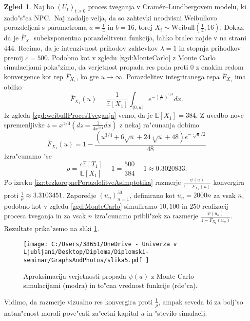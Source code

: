 \documentclass[12pt, a4paper, reqno]{amsart}
\theoremstyle{definition}
\newtheorem{zgled}[definicija]{Zgled}
\theoremstyle{plain}
\newcommand{\E}{\mathbb{E}}
\newcommand{\1}{\mathds{1}}
\begin{document}
        \begin{zgled}
        Naj bo $(U_t)_{t\geq0}$ proces tveganja v Cramér--Lundbergovem modelu, ki zado"s"ca NPC.\ Naj 
        nadalje velja, da so zahtevki neodvisni Weibullovo porazdeljeni s parametroma
        $a= \frac{1}{4}$ in $b= 16$, torej $X_i\sim\text{Weibull}(\frac{1}{4}, 16)$. 
        Dokaz, da je $\overline{F}_{X_1}$ subeksponentna porazdelitvena funkcija, lahko bralec 
        najde v \cite{9} na strani 444.
        Recimo, da je intenzivnost 
        prihodov zahtevkov $\lambda = 1$ in stopnja prihodkov premij $c = 500$.
        Podobno kot v zgledu \ref{zgd:MonteCarlo} z Monte Carlo simulacijami poka"zimo, da 
        verjetnost propada res pada proti $0$
        z enakim redom konvergence kot rep $\overline{F}_{X_1}$, ko gre $u\to\infty$. 
        Porazdelitev integriranega repa $\overline{F}_{X_1}$ ima obliko
        \begin{equation*}
            \overline{F}_{X_1}(u) = \frac{1}{\E\left[X_1\right]}\int_{(0, u]}e^{-\left(\tfrac{x}{16}\right)^{1/4}}dx.
        \end{equation*}
        Iz zgleda \ref{zgd:weibullProcesTveganja} vemo, da je $\E\left[X_1\right] = 384$. Z uvedbo nove spremenljivke
        $z = x^{1/4} (dz = \frac{1}{4x^{3/4}}dx)$ z nekaj ra"cunanja dobimo 
        \begin{equation*}
            \overline{F}_{X_1}(u) = 1 - \frac{\left(u^{3/4} + 6 \sqrt{u} + 24 \sqrt[4]{u} + 48\right)e^{-{\sqrt[4]{u}}/{2}}}{48}
        \end{equation*}
        Izra"cunamo "se 
        \begin{equation*}
        \rho = \frac{c \E\left[T_1\right]}{\E\left[X_1\right]} - 1 = \frac{500}{384} - 1 \approx 0.3020833.
        \end{equation*}
        Po izreku \ref{izr:tezkorepnePorazdelitveAsimptotika} razmerje $\tfrac{\psi(u)}{1 - \overline{F}_{X_1}(u)}$ konvergira proti $\tfrac{1}{\rho} \approx 3.3103451$.
        Zaporedje $(u_n)_{n = 1}^{50}$, definirano kot $u_n = 2000n$ za vsak $n$, podobno kot v zgledu \ref{zgd:MonteCarlo} simuliramo $10, 100$ in $250$ realizacij
        procesa tveganja in za vsak $n$ izra"cunamo pribli"zek za razmerje $\tfrac{\psi(u_n)}{1 - \overline{F}_{X_1}(u_n)}$.
        Rezultate prika"zemo na sliki \ref{fig:slika5}.
       
        \begin{figure}[H]       
            \centering
            \texttt{[image: 
                C:/Users/38651/OneDrive - Univerza v Ljubljani/Desktop/Diploma/Diplomski-seminar/GraphsAndPhotos/slika5.pdf
                ]}
            \caption{Aproksimacija verjetnosti propada $\psi(u)$ z Monte Carlo simulacijami (modra) in 
            to"cna vrednost funkcije (rde"ca).}
            \label{fig:slika5}
        \end{figure}

        \noindent
        Vidimo, da razmerje vizualno res konvergira proti $\tfrac{1}{\rho}$, ampak seveda bi 
        za bolj"so natan"cnost morali pove"cati za"cetni kapital $u$ in "stevilo simulacij. 
        \label{zg:MonteCarloTezkiRepi}
        \end{zgled}
\end{document}
